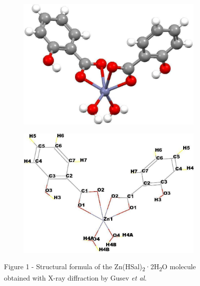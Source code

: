 \begin{figure}[H]
    \centering
    \begin{subfigure}[b]{0.45\textwidth}
        \centering
        \includegraphics[width=\textwidth]{assets/37}
    \end{subfigure}
    \hfill
    \begin{subfigure}[b]{0.45\textwidth}
        \centering
        \includegraphics[width=\textwidth]{assets/38}
    \end{subfigure}
    \caption*{Figure 1 - Structural formula of the Zn(HSal)\textsubscript{2}·2H\textsubscript{2}O molecule obtained with X-ray diffraction by Gusev \emph{et al}.}
\end{figure}

